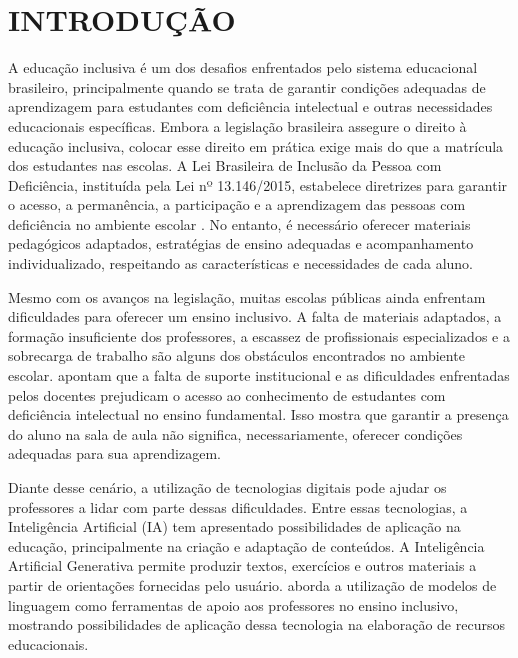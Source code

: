 %
\setcounter{page}{6}
\chapter{INTRODUÇÃO}\label{chap:introducao}


A educação inclusiva é um dos desafios enfrentados pelo sistema educacional brasileiro, principalmente quando se trata de garantir condições adequadas de aprendizagem para estudantes com deficiência intelectual e outras necessidades educacionais específicas. Embora a legislação brasileira assegure o direito à educação inclusiva, colocar esse direito em prática exige mais do que a matrícula dos estudantes nas escolas. A Lei Brasileira de Inclusão da Pessoa com Deficiência, instituída pela Lei nº 13.146/2015, estabelece diretrizes para garantir o acesso, a permanência, a participação e a aprendizagem das pessoas com deficiência no ambiente escolar \cite{brasil2015lbi}. No entanto, é necessário oferecer materiais pedagógicos adaptados, estratégias de ensino adequadas e acompanhamento individualizado, respeitando as características e necessidades de cada aluno.

Mesmo com os avanços na legislação, muitas escolas públicas ainda enfrentam dificuldades para oferecer um ensino inclusivo. A falta de materiais adaptados, a formação insuficiente dos professores, a escassez de profissionais especializados e a sobrecarga de trabalho são alguns dos obstáculos encontrados no ambiente escolar.  apontam que a falta de suporte institucional e as dificuldades enfrentadas pelos docentes prejudicam o acesso ao conhecimento de estudantes com deficiência intelectual no ensino fundamental. Isso mostra que garantir a presença do aluno na sala de aula não significa, necessariamente, oferecer condições adequadas para sua aprendizagem.

Diante desse cenário, a utilização de tecnologias digitais pode ajudar os professores a lidar com parte dessas dificuldades. Entre essas tecnologias, a Inteligência Artificial (IA) tem apresentado possibilidades de aplicação na educação, principalmente na criação e adaptação de conteúdos. A Inteligência Artificial Generativa permite produzir textos, exercícios e outros materiais a partir de orientações fornecidas pelo usuário.  aborda a utilização de modelos de linguagem como ferramentas de apoio aos professores no ensino inclusivo, mostrando possibilidades de aplicação dessa tecnologia na elaboração de recursos educacionais.

